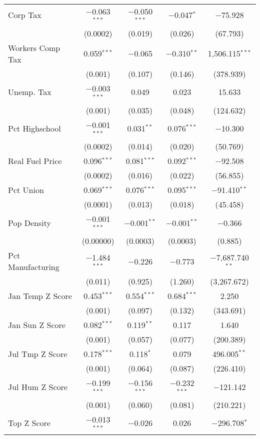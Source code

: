 \begin{table}[!htbp]
\begin{tabular}{@{\extracolsep{5pt}}lcccc}
  Corp Tax & $-$0.063$^{***}$ & $-$0.050$^{***}$ & $-$0.047$^{*}$ & $-$75.928 \\ 
  & (0.0002) & (0.019) & (0.026) & (67.793) \\ 
  Workers Comp Tax & 0.059$^{***}$ & $-$0.065 & $-$0.310$^{**}$ & 1,506.115$^{***}$ \\ 
  & (0.001) & (0.107) & (0.146) & (378.939) \\ 
  Unemp. Tax & $-$0.003$^{***}$ & 0.049 & 0.023 & 15.633 \\ 
  & (0.001) & (0.035) & (0.048) & (124.632) \\ 
  Pct Highschool & $-$0.001$^{***}$ & 0.031$^{**}$ & 0.076$^{***}$ & $-$10.300 \\ 
  & (0.0002) & (0.014) & (0.020) & (50.769) \\ 
  Real Fuel Price & 0.096$^{***}$ & 0.081$^{***}$ & 0.092$^{***}$ & $-$92.508 \\ 
  & (0.0002) & (0.016) & (0.022) & (56.855) \\ 
  Pct Union & 0.069$^{***}$ & 0.076$^{***}$ & 0.095$^{***}$ & $-$91.410$^{**}$ \\ 
  & (0.0001) & (0.013) & (0.018) & (45.458) \\ 
  Pop Density & $-$0.001$^{***}$ & $-$0.001$^{**}$ & $-$0.001$^{**}$ & $-$0.366 \\ 
  & (0.00000) & (0.0003) & (0.0003) & (0.885) \\ 
  Pct Manufacturing & $-$1.484$^{***}$ & $-$0.226 & $-$0.773 & $-$7,687.740$^{**}$ \\ 
  & (0.011) & (0.925) & (1.260) & (3,267.672) \\ 
  Jan Temp Z Score & 0.453$^{***}$ & 0.554$^{***}$ & 0.684$^{***}$ & 2.250 \\ 
  & (0.001) & (0.097) & (0.132) & (343.691) \\ 
  Jan Sun Z Score & 0.082$^{***}$ & 0.119$^{**}$ & 0.117 & 1.640 \\ 
  & (0.001) & (0.057) & (0.077) & (200.389) \\ 
  Jul Tmp Z Score & 0.178$^{***}$ & 0.118$^{*}$ & 0.079 & 496.005$^{**}$ \\ 
  & (0.001) & (0.064) & (0.087) & (226.410) \\ 
  Jul Hum Z Score & $-$0.199$^{***}$ & $-$0.156$^{***}$ & $-$0.232$^{***}$ & $-$121.142 \\ 
  & (0.001) & (0.060) & (0.081) & (210.221) \\ 
  Top Z Score & $-$0.013$^{***}$ & $-$0.026 & 0.026 & $-$296.708$^{*}$ \\ 

\end{tabular}
\end{table}

